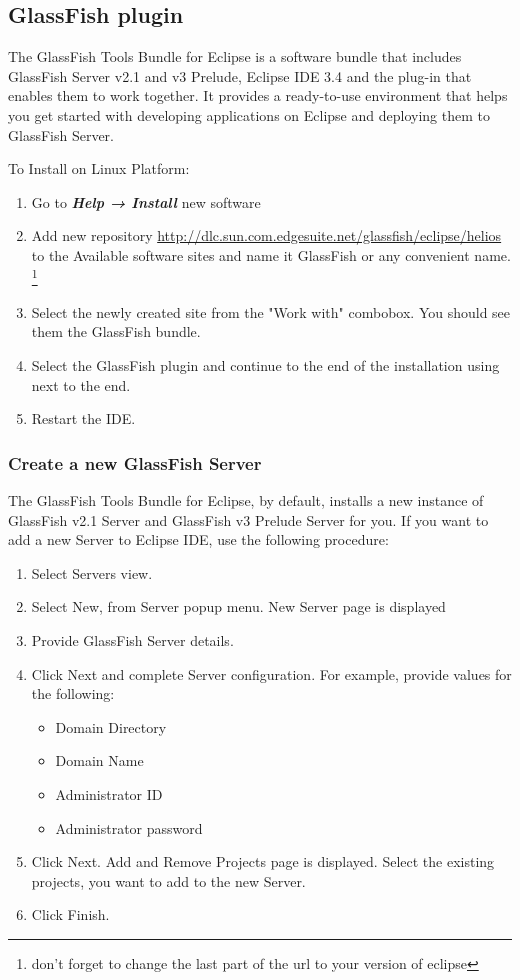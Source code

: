 \subsection{GlassFish plugin}
The GlassFish Tools Bundle for Eclipse is a software bundle that includes GlassFish Server v2.1
and v3 Prelude, Eclipse IDE 3.4 and the plug-in that enables them to work together. It provides
a ready-to-use environment that helps you get started with developing applications on Eclipse
and deploying them to GlassFish Server.

To Install on Linux Platform:
\begin{enumerate}
\item Go to \textbf{\textit{Help → Install}} new software 
\item Add new repository \url{http://dlc.sun.com.edgesuite.net/glassfish/eclipse/helios} to the Available software sites and name it GlassFish or any convenient name. \footnote{don't forget to change the last part of the url to your version of eclipse}
\item Select the newly created site from the "Work with" combobox. You should see them the GlassFish bundle.
\item Select the GlassFish plugin and continue to the end of the installation using next to the end.
\item Restart the IDE.
\end{enumerate}

\subsubsection{Create a new GlassFish Server}
The GlassFish Tools Bundle for Eclipse, by default, installs a new instance of GlassFish v2.1
Server and GlassFish v3 Prelude Server for you. If you want to add a new Server to Eclipse IDE, use the following procedure:

\begin{enumerate}
\item Select Servers view.
\item Select New, from Server popup menu. New Server page is displayed
\item Provide GlassFish Server details.
\item Click Next and complete Server configuration. For example, provide values for the following:
\begin{itemize}
\item Domain Directory
\item Domain Name
\item Administrator ID
\item Administrator password
\end{itemize}
\item Click Next. Add and Remove Projects page is displayed.
Select the existing projects, you want to add to the new Server.
\item Click Finish.
\end{enumerate}

